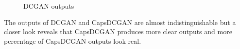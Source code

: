 \documentclass{vldb}
\begin{document}
\begin{figure}[H]
    \centering
    \qquad
    \caption{DCGAN outputs}%
    \label{fig:dcgan_gen}%
\end{figure}
The outputs of DCGAN and CapsDCGAN are almost indistinguishable but a closer look reveals that CapsDCGAN produces more clear outputs and more percentage of CapsDCGAN outputs look real.
\end{document}
